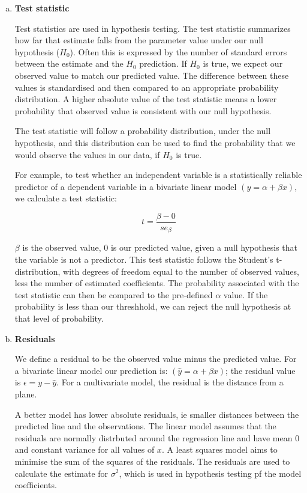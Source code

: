 \documentclass[12pt,letterpaper]{article}
\begin{document}
\begin{enumerate}[(a)]
    \item \textbf{Test statistic}
    
    Test statistics are used in hypothesis testing.  The test statistic
summarizes how far that estimate falls from the parameter value under our null hypothesis ($H_0$). Often this is expressed by the number of standard errors between the estimate and the $H_0$ prediction.  
  If $H_0$ is true, we expect our observed value to match our predicted value.  The difference between these values is standardised and then compared to an appropriate probability distribution.  A higher absolute value of the test statistic means a lower probability that observed value is consistent with our null hypothesis.
  
  The test statistic will follow a probability distribution, under the null hypothesis, and this distribution can be used to find the probability that we would observe the values in our data, if $H_0$ is true.
  
  For example, to test whether an independent variable is a statistically reliable predictor of a dependent variable in a bivariate linear model $(y=\alpha + \beta x)$, we calculate a test statistic:
  
  \[t = \frac{\beta - 0}{se_{\beta}} \]
  
  $\beta$ is the observed value, 0 is our predicted value, given a null hypothesis that the variable is not a predictor.  This test statistic follows the Student's t-distribution, with degrees of freedom equal to the number of observed values, less the number of estimated coefficients.  The probability associated with the test statistic can then be compared to the pre-defined $\alpha$ value.  If the probability is less than our threshhold, we can reject the null hypothesis at that level of probability.

  
    \item \textbf{Residuals}
    
    We define a residual to be the observed value minus the predicted value.  For a  bivariate linear model our prediction is: $(\hat{y}=\alpha + \beta x)$; the residual value is $\epsilon = y - \hat{y}$.  For a multivariate model, the residual is the distance from a plane.
    
    A better model has lower absolute residuals, ie smaller distances between the predicted line and the observations.  The linear model assumes that the residuals are normally distrbuted around the regression line and have mean 0 and constant variance for all values of $x$.  A least squares model aims to minimise the sum of the squares of the residuals.  The residuals are used to calculate the estimate for $\sigma^2$, which is used in hypothesis testing pf the model coefficients.
    

\end{enumerate}
\end{document}
